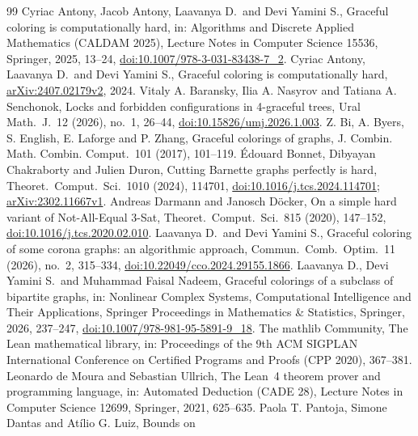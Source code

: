 \documentclass[11pt]{article}
\theoremstyle{remark}
\begin{document}
\begin{thebibliography}{99}
 Cyriac Antony, Jacob Antony, Laavanya D.\ and Devi Yamini S.,
Graceful coloring is computationally hard, in: Algorithms and Discrete Applied
Mathematics (CALDAM 2025), Lecture Notes in Computer Science 15536, Springer, 2025, 13--24,
\href{https://doi.org/10.1007/978-3-031-83438-7_2}{doi:10.1007/978-3-031-83438-7\_2}.
 Cyriac Antony, Laavanya D.\ and Devi Yamini S., Graceful coloring
is computationally hard, \href{https://arxiv.org/abs/2407.02179v2}{arXiv:2407.02179v2}, 2024.
 Vitaly A. Baransky, Ilia A. Nasyrov and Tatiana A. Senchonok,
Locks and forbidden configurations in 4-graceful trees, Ural Math.\ J.\ 12
(2026), no.~1, 26--44,
\href{https://doi.org/10.15826/umj.2026.1.003}{doi:10.15826/umj.2026.1.003}.
 Z. Bi, A. Byers, S. English, E. Laforge and P. Zhang, Graceful colorings of graphs, J. Combin. Math. Combin. Comput.\
101 (2017), 101--119.
 \'Edouard Bonnet, Dibyayan Chakraborty and Julien Duron, Cutting
Barnette graphs perfectly is hard, Theoret.\ Comput.\ Sci.\ 1010 (2024), 114701,
\href{https://doi.org/10.1016/j.tcs.2024.114701}{doi:10.1016/j.tcs.2024.114701};
\href{https://arxiv.org/abs/2302.11667v1}{arXiv:2302.11667v1}.
 Andreas Darmann and Janosch Döcker, On a simple hard variant of
Not-All-Equal 3-Sat, Theoret.\ Comput.\ Sci.\ 815 (2020), 147--152,
\href{https://doi.org/10.1016/j.tcs.2020.02.010}{doi:10.1016/j.tcs.2020.02.010}.
\bibitem{LDcorona} Laavanya D.\ and Devi Yamini S., Graceful coloring of some
corona graphs: an algorithmic approach, Commun.\ Comb.\ Optim.\ 11 (2026),
no.~2, 315--334,
\href{https://doi.org/10.22049/cco.2024.29155.1866}{doi:10.22049/cco.2024.29155.1866}.
\bibitem{LDN} Laavanya D., Devi Yamini S.\ and Muhammad Faisal Nadeem, Graceful
colorings of a subclass of bipartite graphs, in: Nonlinear Complex Systems,
Computational Intelligence and Their Applications, Springer Proceedings in
Mathematics \& Statistics, Springer, 2026, 237--247,
\href{https://doi.org/10.1007/978-981-95-5891-9_18}{doi:10.1007/978-981-95-5891-9\_18}.
\bibitem{Mathlib} The mathlib Community, The Lean mathematical library, in:
Proceedings of the 9th ACM SIGPLAN International Conference on Certified
Programs and Proofs (CPP 2020), 367--381.
 Leonardo de Moura and Sebastian Ullrich, The Lean~4 theorem
prover and programming language, in: Automated Deduction (CADE 28), Lecture
Notes in Computer Science 12699, Springer, 2021, 625--635.
 Paola T. Pantoja, Simone Dantas and Atílio G. Luiz, Bounds on

\end{thebibliography}
\end{document}
